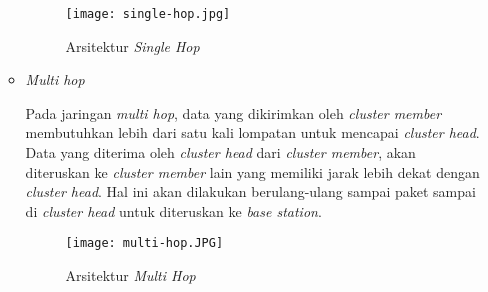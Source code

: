 \begin{enumerate}
\begin{itemize}
        \begin{figure}[H]
        	\centering  
        	\texttt{[image: single-hop.jpg]}  
        	\caption[Arsitektur \textit{Single Hop}]{Arsitektur \textit{Single Hop}}
        	\label{fig:Arsitektur Single Hop} 
        \end{figure} 
        
        \item\textit{Multi hop}
        
        Pada jaringan \textit{multi hop}, data yang dikirimkan oleh \textit{cluster member} membutuhkan lebih dari satu kali lompatan untuk mencapai \textit{cluster head}. Data yang diterima oleh \textit{cluster head} dari \textit{cluster member}, akan diteruskan ke \textit{cluster member} lain yang memiliki jarak lebih dekat dengan \textit{cluster head}. Hal ini akan dilakukan berulang-ulang sampai paket sampai di \textit{cluster head} untuk diteruskan ke \textit{base station}.
        
        \begin{figure}[H]
        	\centering  
        	\texttt{[image: multi-hop.JPG]}  
        	\caption[Arsitektur \textit{Multi Hop}]{Arsitektur \textit{Multi Hop}}
        	\label{fig:Arsitektur Multi Hop} 
        \end{figure} 
        
    \end{itemize}
\end{enumerate}

